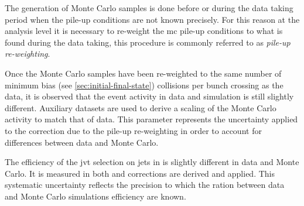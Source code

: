 The generation of Monte Carlo samples is done before or during the data taking
period when the pile-up conditions are not known precisely. For this reason at
the analysis level it is necessary to re-weight the \gls{mc} pile-up conditions
to what is found during the data taking, this procedure is commonly referred to
as \emph{pile-up re-weighting}.
\begin{description}[font=\normalfont]
\item[syst\_PRW\_DATASF:] Once the Monte Carlo samples have been re-weighted to
  the same number of minimum bias (see \cref{sec:initial-final-state})
  collisions per bunch crossing as the data, it is observed that the event
  activity in data and simulation is still slightly different. Auxiliary
  datasets are used to derive a scaling of the Monte Carlo activity to match
  that of data. This parameter represents the uncertainty applied to the
  correction due to the pile-up re-weighting in order to account for differences
  between data and Monte Carlo.
\item[syst\_JvtEfficiency:] The efficiency of the \gls{jvt} selection on jets
  in is slightly different in data and Monte Carlo. It is measured in both and
  corrections are derived and applied. This systematic uncertainty reflects the
  precision to which the ration between data and Monte Carlo simulations
  efficiency are known.
\end{description}
